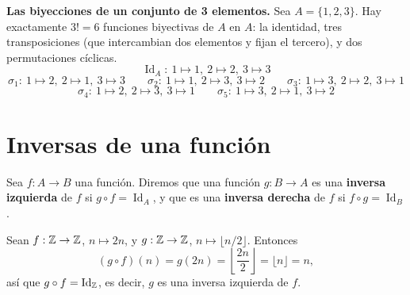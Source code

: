 \documentclass[12pt,a4paper]{book}
\begin{document}
    \begin{ejemplo}
        \textbf{Las biyecciones de un conjunto de 3 elementos.}
        Sea $A=\{1,2,3\}$. Hay exactamente $3!=6$ funciones biyectivas de $A$ en $A$: la identidad, tres transposiciones (que intercambian dos elementos y fijan el tercero), y dos permutaciones cíclicas.
        \begin{equation*}
            \operatorname{Id}_A:\ 1\mapsto1,\ 2\mapsto2,\ 3\mapsto3
        \end{equation*}
        \begin{equation*}
            \sigma_1:\ 1\mapsto2,\ 2\mapsto1,\ 3\mapsto3 \qquad
            \sigma_2:\ 1\mapsto1,\ 2\mapsto3,\ 3\mapsto2 \qquad
            \sigma_3:\ 1\mapsto3,\ 2\mapsto2,\ 3\mapsto1
        \end{equation*}
        \begin{equation*}
            \sigma_4:\ 1\mapsto2,\ 2\mapsto3,\ 3\mapsto1 \qquad
            \sigma_5:\ 1\mapsto3,\ 2\mapsto1,\ 3\mapsto2
        \end{equation*}
    \end{ejemplo}

    \section{Inversas de una función}

    \begin{definicion}
        Sea $f:A\to B$ una función. Diremos que una función $g:B\to A$ es una \textbf{inversa izquierda} de $f$ si $g\circ f = \operatorname{Id}_A$, y que es una \textbf{inversa derecha} de $f$ si $f\circ g = \operatorname{Id}_B$.
    \end{definicion}

    \begin{ejemplo}
        Sean $f:\mathbb{Z}\to\mathbb{Z}$, $n\mapsto 2n$, y $g:\mathbb{Z}\to\mathbb{Z}$, $n\mapsto\lfloor n/2\rfloor$. Entonces
        \begin{equation*}
            (g\circ f)(n) = g(2n) = \left\lfloor \frac{2n}{2}\right\rfloor = \lfloor n\rfloor = n,
        \end{equation*}
        así que $g\circ f = \operatorname{Id}_{\mathbb{Z}}$, es decir, $g$ es una inversa izquierda de $f$.
    \end{ejemplo}
\end{document}
